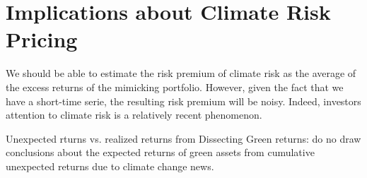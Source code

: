 \section{Implications about Climate Risk Pricing}

We should be able to estimate the risk premium of climate risk
as the average of the excess returns of the mimicking portfolio. 
However, given the fact that we have a short-time serie, 
the resulting risk premium will be noisy. Indeed, 
investors attention to climate risk is a relatively recent phenomenon.

Unexpected rturns vs. realized returns from Dissecting Green returns:
do no draw conclusions about the expected returns of green assets
from cumulative unexpected returns due to climate change news.












